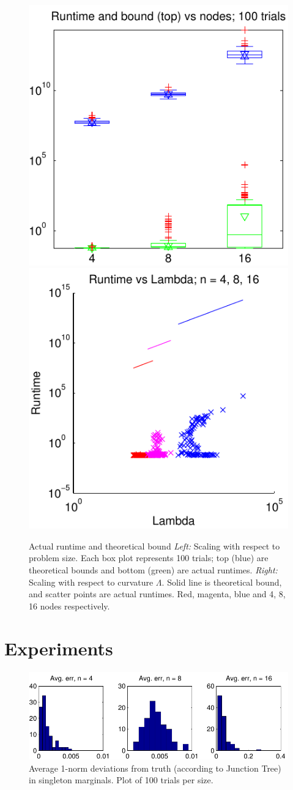 \documentclass[english]{article}
\newcommand{\+}[1]{\ensuremath{\boldsymbol{\mathrm{#1}}}}
\begin{document}
\begin{figure}
\centering
\includegraphics[width=0.49\linewidth, clip]{nodes_time}
\includegraphics[width=0.49\linewidth, clip]{lambda_time}
\caption{Actual runtime and theoretical bound  \emph{Left:} Scaling with respect to problem size. Each box plot represents 100 trials; top (blue) are theoretical bounds and bottom (green) are actual runtimes. \emph{Right:} Scaling with respect to curvature $\Lambda$. Solid line is theoretical bound, and scatter points are actual runtimes. Red, magenta, blue and 4, 8, 16 nodes respectively.} \label{fig:time}
\end{figure}
\section{Experiments}
\begin{figure}
\centering
\includegraphics[width=\linewidth, clip]{errors}
\caption{Average 1-norm deviations from truth (according to Junction Tree) in singleton marginals. Plot of 100 trials per size.} \label{fig:errors}
\end{figure}
\end{document}

